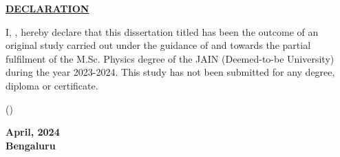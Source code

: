 \thispagestyle{empty}

\begin{center}
    \Large

    \underline{\textbf{DECLARATION}}\\

\end{center}

\vspace{1.5cm}

\noindent
I, \textbf{\auth{}}, hereby declare that this dissertation titled \textbf{\projectname} has been the outcome of an original study carried out under the guidance of \textbf{\gnameOne} and \textbf{\gnameTwo} towards
the partial fulfilment of the M.Sc. Physics degree of the JAIN (Deemed-to-be University)
during the year 2023-2024. This study has not been submitted for any degree, diploma or
certificate.

\vspace{5cm}

\noindent
\begin{minipage}{0.5\textwidth}
    \flushleft
    (\auth)

\end{minipage}%
\begin{minipage}{0.5\textwidth}
    \flushright

    \textbf{April, 2024\\
      Bengaluru}
\end{minipage}

